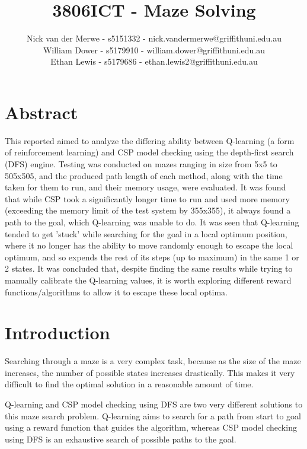 \documentclass{article}
\title{3806ICT - Maze Solving}
\author{Nick van der Merwe - s5151332 - nick.vandermerwe@griffithuni.edu.au \\
    William Dower - s5179910 - william.dower@griffithuni.edu.au \\
    Ethan Lewis - s5179686 - ethan.lewis2@griffithuni.edu.au}
\newcommand\tab[1][1cm]{\hspace*{#1}}
\begin{document}
    \maketitle


    \section{Abstract}\label{sec:abstract}
        This reported aimed to analyze the differing ability between Q-learning 
        (a form of reinforcement learning) and CSP model checking using the 
        depth-first search (DFS) engine. Testing was conducted on mazes 
        ranging in size from 5x5 to 505x505, and the produced path length of 
        each method, along with the time taken for them to run, and their 
        memory usage, were evaluated. It was found that while CSP took a 
        significantly longer time to run and used more memory (exceeding the
        memory limit of the test system by 355x355), it always found a path
        to the goal, which Q-learning was unable to do. It was seen that 
        Q-learning tended to get 'stuck' while searching for the goal in a
        local optimum position, where it no longer has the ability to move 
        randomly enough to escape the local optimum, and so expends the rest 
        of its steps (up to maximum) in the same 1 or 2 states. It was concluded
        that, despite finding the same results while trying to manually 
        calibrate the Q-learning values, it is worth exploring different
        reward functions/algorithms to allow it to escape these local optima.

    \section{Introduction}\label{sec:introduction}
        Searching through a maze is a very complex task, because as the size 
        of the maze increases, the number of possible states increases 
        drastically. This makes it very difficult to find the 
        optimal solution in a reasonable amount of time.

        \tab Q-learning and CSP model checking using DFS are two very different 
        solutions to this maze search problem. Q-learning aims to search 
        for a path from start to goal using a reward function that guides 
        the algorithm, whereas CSP model checking using DFS is an exhaustive 
        search of possible paths to the goal.
\end{document}

